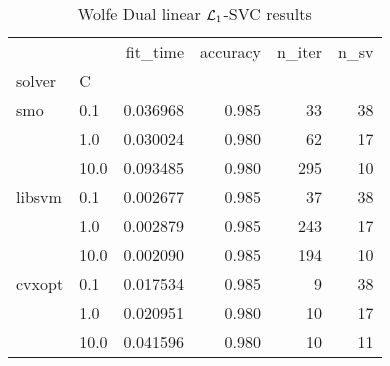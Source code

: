 \begin{table}[H]
\centering
\caption{Wolfe Dual linear $\protect \mathcal{L}_1$-SVC results}
\label{linear_dual_l1_svc_cv_results}
\begin{tabular}{llrrrr}
\toprule
       &      &  fit\_time &  accuracy &  n\_iter &  n\_sv \\
solver & C &           &           &         &       \\
\midrule
smo & 0.1  &  0.036968 &     0.985 &      33 &    38 \\
       & 1.0  &  0.030024 &     0.980 &      62 &    17 \\
       & 10.0 &  0.093485 &     0.980 &     295 &    10 \\
libsvm & 0.1  &  0.002677 &     0.985 &      37 &    38 \\
       & 1.0  &  0.002879 &     0.985 &     243 &    17 \\
       & 10.0 &  0.002090 &     0.985 &     194 &    10 \\
cvxopt & 0.1  &  0.017534 &     0.985 &       9 &    38 \\
       & 1.0  &  0.020951 &     0.980 &      10 &    17 \\
       & 10.0 &  0.041596 &     0.980 &      10 &    11 \\
\bottomrule
\end{tabular}
\end{table}
